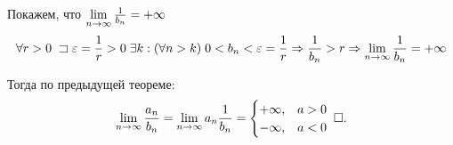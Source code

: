 \documentclass{article}
\begin{document}
\proof

Покажем, что $\lim\limits_{n\to\infty}\frac{1}{b_{n}}=+\infty$
\begin{align*}
	\forall r>0\;\sqsupset\varepsilon=\frac{1}{r}>0\;\exists k:(\forall n>k)\;0<b_{n}<\varepsilon=\frac{1}{r}\Rightarrow \frac{1}{b_{n}}>r\Rightarrow\lim\limits_{n\to\infty}\frac{1}{b_{n}}=+\infty
\end{align*}

Тогда по предыдущей теореме:
\begin{align*}
	\lim\limits_{n\to\infty} \frac{a_{n}}{b_{n}}=\lim\limits_{n\to\infty} a_{n}\frac{1}{b_{n}}=
	\begin{cases}
		+\infty, & a>0 \\
		-\infty, & a<0
	\end{cases}\;\square.
\end{align*}
\end{document}
